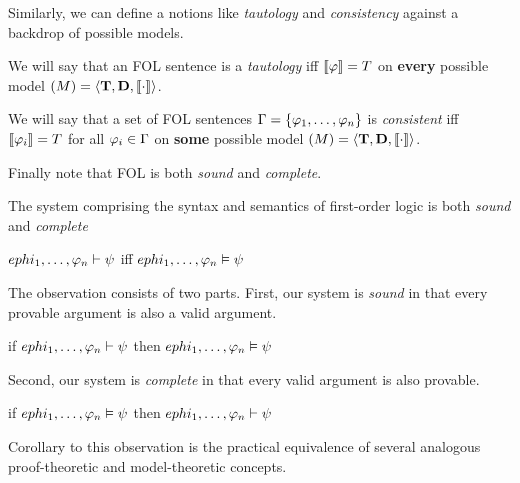 Similarly, we can define a notions like \emph{tautology} and \emph{consistency}
against a backdrop of possible models.

\begin{definition}[Tautology]
  \label{def:fol-logical-truth}
  We will say that an FOL sentence \ephi is a \emph{tautology} iff
  $\llbracket\varphi\rrbracket=T$ on \textbf{every} possible model
  $\mathcal(M)=\langle\mathbf{T},\mathbf{D},\llbracket\cdot\rrbracket\rangle$.
\end{definition}

\begin{definition}[Consistency]
  We will say that a set of FOL sentences $\Gamma=\{\varphi_1,\dots,\varphi_n\}$ is
  \emph{consistent} iff
  $\llbracket\varphi_i\rrbracket=T$ for all $\varphi_i\in\Gamma$ on \textbf{some} possible
  model $\mathcal(M)=\langle\mathbf{T},\mathbf{D},\llbracket\cdot\rrbracket\rangle$.
\end{definition}

Finally note that FOL is both \emph{sound} and \emph{complete}.

\begin{observation}
  The system comprising the syntax and semantics of first-order logic is both
  \emph{sound} and \emph{complete}
  \begin{argument}
  \item[ ] $ephi_1,\dots,\varphi_n\vdash\psi$ iff
    $ephi_1,\dots,\varphi_n\vDash\psi$
  \end{argument}
  The observation consists of two parts. First, our system is \emph{sound} in
  that every provable argument is also a valid argument.
  \begin{argument}
  \item[ ] if $ephi_1,\dots,\varphi_n\vdash\psi$
    then $ephi_1,\dots,\varphi_n\vDash\psi$
  \end{argument}
  Second, our system is \emph{complete} in that every valid argument is also
  provable.
  \begin{argument}
  \item[ ] if $ephi_1,\dots,\varphi_n\vDash\psi$
    then $ephi_1,\dots,\varphi_n\vdash\psi$
  \end{argument}
\end{observation}

Corollary to this observation is the practical equivalence of several analogous
proof-theoretic and model-theoretic concepts.

